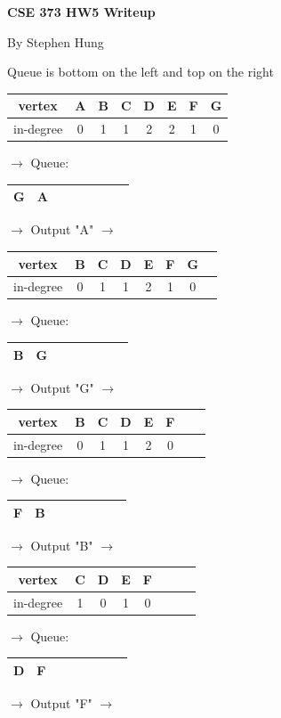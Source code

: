 \documentclass[12pt]{exam}
\begin{document}
\centerline{\textbf{CSE 373 HW5 Writeup}}
\centerline{By Stephen Hung}

\begin{questions}



Queue is bottom on the left and top on the right

\begin{tabular}{ |c|c|c|c|c|c|c|c| }
\hline
vertex & A & B & C & D & E & F & G \\
\hline
in-degree & 0 & 1 & 1 & 2 & 2 & 1 & 0 \\
\hline
\end{tabular}
$\rightarrow$ 
Queue: 
\begin{tabular}{ c c c c c c c c }
\hline
G & A \\
\hline
\end{tabular}
$\rightarrow$ Output "A" $\rightarrow$

\begin{tabular}{ |c|c|c|c|c|c|c|c| }
\hline
vertex & B & C & D & E & F & G \\
\hline
in-degree & 0 & 1 & 1 & 2 & 1 & 0 \\
\hline
\end{tabular}
$\rightarrow$ 
Queue: 
\begin{tabular}{ c c c c c c c c }
\hline
B & G \\
\hline
\end{tabular}
$\rightarrow$ Output "G" $\rightarrow$

\begin{tabular}{ |c|c|c|c|c|c|c|c| }
\hline
vertex & B & C & D & E & F \\
\hline
in-degree & 0 & 1 & 1 & 2 & 0 \\
\hline
\end{tabular}
$\rightarrow$ 
Queue: 
\begin{tabular}{ c c c c c c c c }
\hline
F & B \\
\hline
\end{tabular}
$\rightarrow$ Output "B" $\rightarrow$

\begin{tabular}{ |c|c|c|c|c|c|c|c| }
\hline
vertex & C & D & E & F \\
\hline
in-degree & 1 & 0 & 1 & 0 \\
\hline
\end{tabular}
$\rightarrow$ 
Queue: 
\begin{tabular}{ c c c c c c c c }
\hline
D & F \\
\hline
\end{tabular}
$\rightarrow$ Output "F" $\rightarrow$


\end{questions}
\end{document}

